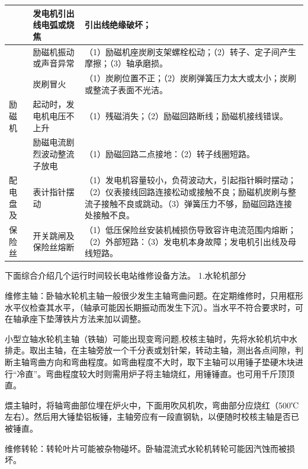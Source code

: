\documentclass{ctexbook}
\begin{document}
\begin{table}[htbp]
\begin{tabular}{l|l|p{80em}}
		&发电机引出线电弧或烧焦&引出线绝缘破坏；\\ \hline
		&励磁机振动或声音异常&（1）励磁机座炭刷支架螺栓松动；\newline{}（2）转子、定子间产生摩擦；\newline{}（3）轴承磨损。\\ \hline
		&炭刷冒火&（1）炭刷位置不正；\newline{}（2）炭刷弹簧压力太大或太小；炭刷或整流子表面不光洁。\\ \hline
		励磁机&起动时，发电机电压不上升&（1）残磁消失；\newline{}（2）励磁回路断线；励磁机接线错误。\\ \hline
		&励磁电流剧烈波动整流子放电&（1）励磁回路二点接地：\newline{}（2）转子线圈短路。\\ \hline
		配电盘及&表计指针摆动&（1）发电机容量较小，负荷波动大，引起指针瞬时摆动；\newline{}（2）仪表接线回路连接松动或接触不良；励磁机炭刷与整流子接触不良或跳动。\newline{}（3）弹簧压力不够，励磁回路连接处接触不良。\\ \hline
		保险丝&开关跳闸及保险丝熔断&（1）低压保险丝安装机械损伤导致容许电流范围内熔断；\newline{}（2）外部短路：\newline{}（3）发电机本身故障；发电机引出线及母线短路。\\
		\hline
	\end{tabular}%
	\label{tab:shigu}%
\end{table}%

下面综合介绍几个运行时间较长电站维修设备方法。
1.水轮机部分

维修主轴：卧轴水轮机主轴一般很少发生主轴弯曲问题。在定期维修时，只用框形水平仪检查其水平，（轴承可能因长期振动而发生下沉）。当水平不符合要求时，可在轴承座下垫薄铁片方法来加以调整。

小型立轴水轮机主轴（铁轴）可能出现变弯问题,校核主轴时，先将水轮机坑中水排走。取出主轴，在主轴旁放一个千分表或划针架，转动主轴，测出各点间隙，判断主轴弯曲方向和弯曲程度。如弯曲程度不大时，取下主轴可以用锤子垫硬木块进行“冷直”。弯曲程度较大时则需用炉子将主轴烧红，用锤锤直。也可用千斤顶顶直。

煨主轴时，将轴弯曲部位埋在炉火中，下面用吹风机吹，弯曲部分应烧红（500℃左右）。然后用大锤垫铝板锤，主轴旁应有一段直钢轨，以便随时校核主轴是否已被锤直。

维修转轮：转轮叶片可能被杂物碰坏。卧轴混流式水轮机转轮可能因汽蚀而被损坏。
\end{document}
